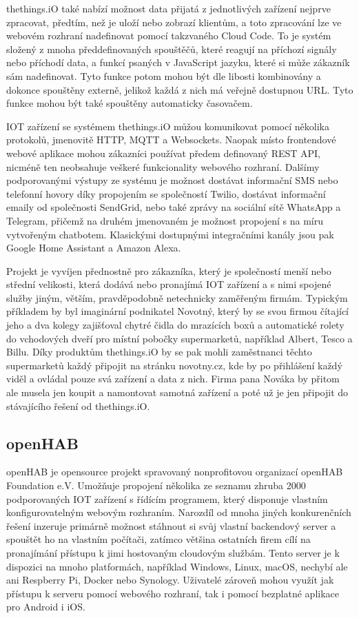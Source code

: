 thethings.iO také nabízí možnost data přijatá z jednotlivých zařízení nejprve zpracovat, předtím, než je uloží nebo zobrazí klientům, a toto zpracování lze ve webovém rozhraní nadefinovat pomocí takzvaného Cloud Code. To je systém složený z mnoha předdefinovaných spouštěčů, které reagují na příchozí signály nebo příchodí data, a funkcí psaných v JavaScript jazyku, které si může zákazník sám nadefinovat. Tyto funkce potom mohou být dle libosti kombinovány a dokonce spouštěny externě, jelikož každá z nich má veřejně dostupnou URL. Tyto funkce mohou být také spouštěny automaticky časovačem.

IOT zařízení se systémem thethings.iO můžou komunikovat pomocí několika protokolů, jmenovitě HTTP, MQTT a Websockets. Naopak místo frontendové webové aplikace mohou zákazníci používat předem definovaný REST API, nicméně ten neobsahuje veškeré funkcionality webového rozhraní. Dalšímy podporovanými výstupy ze systému je možnost dostávat informační SMS nebo telefonní hovory díky propojením se společností Twilio, dostávat informační emaily od společnosti SendGrid, nebo také zprávy na sociální sítě WhatsApp a Telegram, přičemž na druhém jmenovaném je možnost propojení s na míru vytvořeným chatbotem. Klasickými dostupnými integračními kanály jsou pak Google Home Assistant a Amazon Alexa.

Projekt je vyvíjen přednostně pro zákazníka, který je společností menší nebo střední velikosti, která dodává nebo pronajímá IOT zařízení a s nimi spojené služby jiným, větším, pravděpodobně netechnicky zaměřeným firmám. Typickým příkladem by byl imaginární podnikatel Novotný, který by se svou firmou čítající jeho a dva kolegy zajišťoval chytré čidla do mrazících boxů a automatické rolety do vchodových dveří pro místní pobočky supermarketů, například Albert, Tesco a Billu. Díky produktům thethings.iO by se pak mohli zaměstnanci těchto supermarketů každý připojit na stránku novotny.cz, kde by po přihlášení každý viděl a ovládal pouze svá zařízení a data z nich. Firma pana Nováka by přitom ale musela jen koupit a namontovat samotná zařízení a poté už je jen připojit do stávajícího řešení od thethings.iO. 

\subsection{openHAB}

openHAB je opensource projekt spravovaný nonprofitovou organizací openHAB Foundation e.V. Umožňuje propojení několika ze seznamu zhruba 2000 podporovaných IOT zařízení s řídícím programem, který disponuje vlastním konfigurovatelným webovým rozhraním. Narozdíl od mnoha jiných konkurenčních řešení inzeruje primárně možnost stáhnout si svůj vlastní backendový server a spouštět ho na vlastním počítači, zatímco většina ostatních firem cílí na pronajímání přístupu k jimi hostovaným cloudovým službám. Tento server je k dispozici na mnoho platformách, například Windows, Linux, macOS, nechybí ale ani Respberry Pi, Docker nebo Synology. Uživatelé zároveň mohou využít jak přístupu k serveru pomocí webového rozhraní, tak i pomocí bezplatné aplikace pro Android i iOS. 

